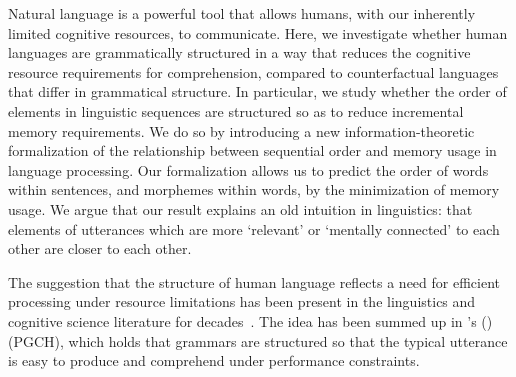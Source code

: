 
Natural language is a powerful tool that allows humans, with our inherently limited cognitive resources, to communicate.
Here, we investigate whether human languages are grammatically structured in a way that reduces the cognitive resource requirements for comprehension, compared to counterfactual languages that differ in grammatical structure. %
In particular, we study whether the order of elements in linguistic sequences are structured so as to reduce incremental memory requirements. We do so by introducing a new information-theoretic formalization of the relationship between sequential order and memory usage in language processing. Our formalization allows us to predict the order of words within sentences, and morphemes within words, by the minimization of memory usage. We argue that our result explains an old intuition in linguistics: that elements of utterances which are more `relevant' or `mentally connected' to each other are closer to each other.

The suggestion that the structure of human language reflects a need for efficient processing under resource limitations has been present in the linguistics and cognitive science literature for decades~\citep{yngve1960model,berwick1984grammatical,hawkins1994performance,chomsky2005three,jaeger2011language,gibson2019efficiency,hahn2020universals}. The idea has been summed up in \citeauthor{hawkins2004efficiency}'s (\citeyear{hawkins2004efficiency})  (PGCH), which holds that grammars are structured so that the typical utterance is easy to produce and comprehend under performance constraints.

